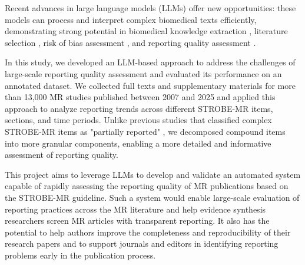 Recent advances in large language models (LLMs) offer new opportunities: these models can process and interpret complex biomedical texts efficiently, demonstrating strong potential in biomedical knowledge extraction \cite{legate_semiautomated_2024}, literature selection \cite{laignelot_large_2026}, risk of bias assessment \cite{nyrhi_large_2026, lai_assessing_2024}, and reporting quality assessment \cite{srinivasan_large_2025, luo_using_2025}.

In this study, we developed an LLM-based approach to address the challenges of large-scale reporting quality assessment and evaluated its performance on an annotated dataset. We collected full texts and supplementary materials for more than 13,000 MR studies published between 2007 and 2025 and applied this approach to analyze reporting trends across different STROBE-MR items, sections, and time periods. Unlike previous studies that classified complex STROBE-MR items as "partially reported" \cite{gibson_reporting_2023}, we decomposed compound items into more granular components, enabling a more detailed and informative assessment of reporting quality.

This project aims to leverage LLMs to develop and validate an automated system capable of rapidly assessing the reporting quality of MR publications based on the STROBE-MR guideline. Such a system would enable large-scale evaluation of reporting practices across the MR literature and help evidence synthesis researchers screen MR articles with transparent reporting. It also has the potential to help authors improve the completeness and reproducibility of their research papers and to support journals and editors in identifying reporting problems early in the publication process.




